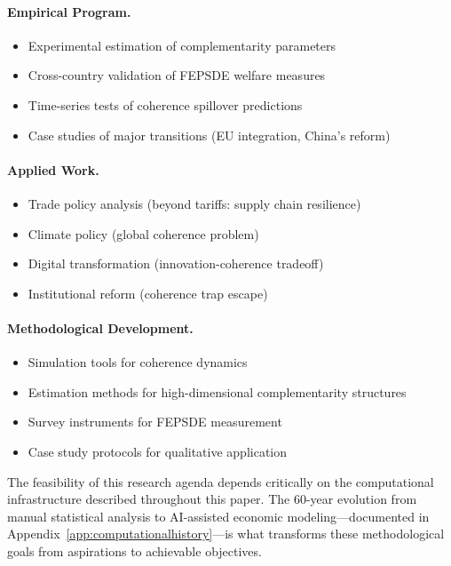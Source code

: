 \paragraph{Empirical Program.}
\begin{itemize}
  \item Experimental estimation of complementarity parameters
  \item Cross-country validation of FEPSDE welfare measures
  \item Time-series tests of coherence spillover predictions
  \item Case studies of major transitions (EU integration, China's reform)
\end{itemize}

\paragraph{Applied Work.}
\begin{itemize}
  \item Trade policy analysis (beyond tariffs: supply chain resilience)
  \item Climate policy (global coherence problem)
  \item Digital transformation (innovation-coherence tradeoff)
  \item Institutional reform (coherence trap escape)
\end{itemize}

\paragraph{Methodological Development.}
\begin{itemize}
  \item Simulation tools for coherence dynamics
  \item Estimation methods for high-dimensional complementarity structures
  \item Survey instruments for FEPSDE measurement
  \item Case study protocols for qualitative application
\end{itemize}

The feasibility of this research agenda depends critically on
the computational infrastructure described throughout this paper.
The 60-year evolution from manual statistical analysis to AI-assisted
economic modeling---documented in Appendix~\ref{app:computationalhistory}---is
what transforms these methodological goals from aspirations to achievable objectives.

